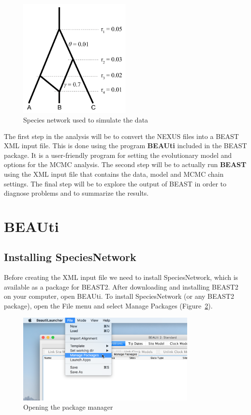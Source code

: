 \documentclass[11pt]{article}
\begin{document}
\begin{figure}[h]
\center
\includegraphics[width=0.5\textwidth]{figs/fig1_spnetwork.pdf}
\caption{Species network used to simulate the data}
\label{fig_spnetwork}
\end{figure}

The first step in the analysis will be to convert the NEXUS files into a BEAST XML input file. This is done using the program \textbf{BEAUti} included in the BEAST package. It is a user-friendly program for setting the evolutionary model and options for the MCMC analysis. The second step will be to actually run \textbf{BEAST} using the XML input file that contains the data, model and MCMC chain settings. The final step will be to explore the output of BEAST in order to diagnose problems and to summarize the results.

\section*{BEAUti}

\subsection*{Installing SpeciesNetwork}

Before creating the XML input file we need to install SpeciesNetwork, which is available as a package for BEAST2.
After downloading and installing BEAST2 on your computer, open BEAUti. To install SpeciesNetwork (or
any BEAST2 package), open the File menu and select Manage Packages (Figure~\ref{fig:managePackages}).

\begin{figure}[htb!]
\centering
\includegraphics[width=0.8\textwidth]{figs/managePackages.png}
\caption
{Opening the package manager}
\label{fig:managePackages}
\end{figure}
\end{document}
